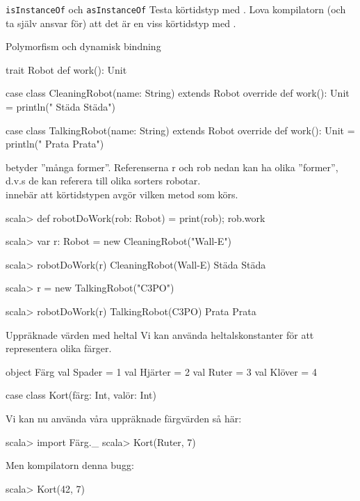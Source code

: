\begin{Slide}{\texttt{isInstanceOf} och \texttt{asInstanceOf}}\SlideFontTiny
Testa körtidstyp med . Lova kompilatorn (och ta själv ansvar för) att det är en viss körtidstyp med .
\end{Slide}



\begin{Slide}{Polymorfism och dynamisk bindning}\SlideFontTiny
\begin{Code}[basicstyle=\SlideFontSize{6.2}{7.5}\ttfamily\selectfont]
trait Robot { def work(): Unit }

case class CleaningRobot(name: String) extends Robot {
  override def work(): Unit = println(" Städa Städa")
}

case class TalkingRobot(name: String) extends Robot {
  override def work(): Unit = println(" Prata Prata")
}
\end{Code}
 betyder ''många former''. Referenserna r och rob nedan kan ha olika ''former'', d.v.s de kan referera till olika sorters robotar. \\  innebär att körtidstypen avgör vilken metod som körs.
\begin{REPL}[basicstyle=\color{white}\SlideFontSize{6.2}{7.5}\ttfamily\selectfont]
scala> def robotDoWork(rob: Robot) = { print(rob); rob.work }

scala> var r: Robot = new CleaningRobot("Wall-E")

scala> robotDoWork(r)
CleaningRobot(Wall-E) Städa Städa

scala> r = new TalkingRobot("C3PO")

scala> robotDoWork(r)
TalkingRobot(C3PO) Prata Prata
\end{REPL}
\end{Slide}



\begin{Slide}{Uppräknade värden med heltal}\SlideFontSmall
Vi kan använda heltalskonstanter för att representera olika färger.
\begin{Code}
object Färg {
  val Spader = 1
  val Hjärter = 2
  val Ruter = 3
  val Klöver = 4
}
\end{Code}
\begin{Code}[language=,keywords={case,class}]
case class Kort(färg: Int, valör: Int)
\end{Code}

Vi kan nu använda våra uppräknade färgvärden så här:
\begin{REPL}
scala> import Färg._
scala> Kort(Ruter, 7)
\end{REPL}
\pause Men kompilatorn  denna bugg:
\begin{REPL}
scala> Kort(42, 7)
\end{REPL}

\end{Slide}


